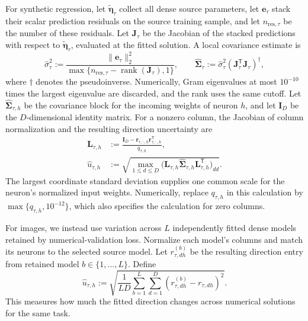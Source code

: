 For synthetic regression, let $\widetilde{\boldsymbol\eta}_\tau$
collect all dense source parameters, let $\mathbf e_\tau$ stack
their scalar prediction residuals on the source training sample,
and let $n_{\mathrm{res},\tau}$ be the number of these residuals.
Let $\mathbf J_\tau$ be the Jacobian of the stacked predictions
with respect to $\widetilde{\boldsymbol\eta}_\tau$, evaluated at
the fitted solution. A local covariance estimate is
\begin{equation}
    \widehat\sigma_\tau^2
        :=\frac{\|\mathbf e_\tau\|_2^2}
            {\max\{n_{\mathrm{res},\tau}
                -\operatorname{rank}(\mathbf J_\tau),1\}},
    \qquad
    \widehat{\boldsymbol\Sigma}_\tau
        :=\widehat\sigma_\tau^2
            (\mathbf J_\tau^{\mathsf T}\mathbf J_\tau)^\dagger,
    \label{eq:method-relu-covariance}
\end{equation}
where $\dagger$ denotes the pseudoinverse. Numerically, Gram
eigenvalues at most $10^{-10}$ times the largest eigenvalue are
discarded, and the rank uses the same cutoff.
Let $\widehat{\boldsymbol\Sigma}_{\tau,h}$ be the covariance block
for the incoming weights of neuron $h$, and let $\mathbf I_D$
be the $D$-dimensional identity matrix. For a nonzero column, the
Jacobian of column normalization and the resulting direction
uncertainty are
\begin{equation}
    \begin{aligned}
        \mathbf L_{\tau,h}
            &:=\frac{\mathbf I_D
                -\mathbf r_{\tau,:,h}\mathbf r_{\tau,:,h}^{\mathsf T}}
                {q_{\tau,h}},\\
        \widehat u_{\tau,h}
            &:=\sqrt{\max_{1\le d\le D}
                \bigl(\mathbf L_{\tau,h}
                    \widehat{\boldsymbol\Sigma}_{\tau,h}
                    \mathbf L_{\tau,h}^{\mathsf T}\bigr)_{dd}}.
    \end{aligned}
    \label{eq:method-relu-direction-uncertainty}
\end{equation}
The largest coordinate standard deviation supplies one common scale
for the neuron's normalized input weights. Numerically, replace $q_{\tau,h}$
in this calculation by $\max\{q_{\tau,h},10^{-12}\}$, which also
specifies the calculation for zero columns.

For images, we instead use variation across $L$ independently
fitted dense models retained by numerical-validation loss.
Normalize each model's columns and match its neurons to the selected
source model. Let $r_{\tau,dh}^{(b)}$ be the resulting direction
entry from retained model $b\in\{1,\ldots,L\}$. Define
\begin{equation}
    \widehat u_{\tau,h}
        :=\sqrt{\frac{1}{LD}\sum_{b=1}^L\sum_{d=1}^D
            (r_{\tau,dh}^{(b)}-r_{\tau,dh})^2}.
    \label{eq:method-relu-image-uncertainty}
\end{equation}
This measures how much the fitted direction changes across numerical
solutions for the same task.

